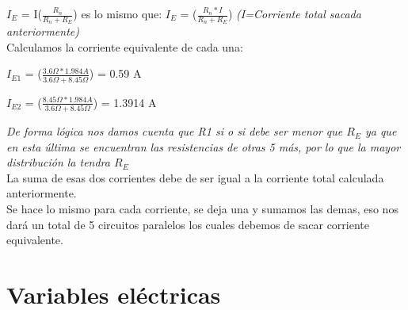 \documentclass[a4paper,11pt]{article}
\begin{document}
\begin{enumerate}
    $I_E$ = I($\frac{R_n}{R_n+R_E}$) es lo mismo que: $I_E$ = ($\frac{R_n*I}{R_n+R_E}$) \textit{(I=Corriente total sacada anteriormente)}
    \vspace{0.3cm}\\
    Calculamos la corriente equivalente de cada una:
    \begin{center}
        $I_{E1}$ = ($\frac{3.6 \Omega * 1.984 A}{3.6 \Omega + 8.45 \Omega}$) = 0.59 A 
    
        $I_{E2}$ = ($\frac{8.45 \Omega * 1.984 A}{3.6 \Omega + 8.45 \Omega}$) = 1.3914 A 
    \end{center}
    \noindent \textit{De forma lógica nos damos cuenta que R1 si o si debe ser menor que $R_E$ ya que en esta última se encuentran las resistencias de otras 5 más, por lo que la mayor distribución la tendra $R_E$}
    \vspace{0.3cm}\\
    \noindent La suma de esas dos corrientes debe de ser igual a la corriente total calculada anteriormente.
    \vspace{0.3cm}\\
    \noindent Se hace lo mismo para cada corriente, se deja una y sumamos las demas, eso nos dará un total de 5 circuitos paralelos los cuales debemos de sacar corriente equivalente.
\newpage
\section{Variables eléctricas}







\end{enumerate}
\end{document}
